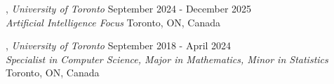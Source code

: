 

, \textit{University of Toronto} \hfill	September 2024 - December 2025\\
\textit{\small Artificial Intelligence Focus} \hfill Toronto, ON, Canada


, \textit{University of Toronto}	\hfill September 2018 - April 2024 \\
\textit{\small Specialist in Computer Science, Major in Mathematics, Minor in Statistics} \hfill Toronto, ON, Canada




